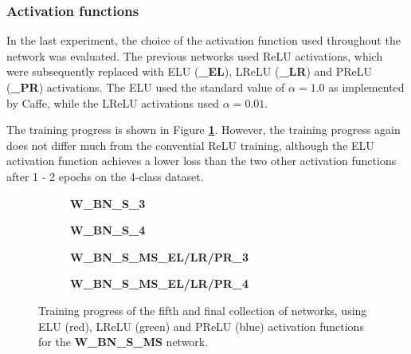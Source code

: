 	\subsubsection{Activation functions}

In the last experiment, the choice of the activation function used throughout the network was evaluated. The previous networks used ReLU activations, which were subsequently replaced with ELU (\textbf{\_EL}), LReLU (\textbf{\_LR}) and PReLU (\textbf{\_PR}) activations. The ELU used the standard value of $\alpha = 1.0$ as implemented by Caffe, while the LReLU activations used $\alpha = 0.01$.

The training progress is shown in Figure \textbf{\ref{fig:weighted_batchnorm_shuffle_msra_acts_training}}. However, the training progress again does not differ much from the convential ReLU training, although the ELU activation function achieves a lower loss than the two other activation functions after 1 - 2 epochs on the 4-class dataset.\\


\begin {figure}[!htb]
	\begin {subfigure}[b]{0.4\linewidth}
		\scalebox{0.65}{}
		\caption{\textbf{W\_BN\_S\_3}}
	\end {subfigure}\hspace{1.75cm}
	\begin {subfigure}[b]{0.4\linewidth}
		\scalebox{0.65}{}
		\caption{\textbf{W\_BN\_S\_4}}
	\end {subfigure}

	\begin {subfigure}[b]{0.4\linewidth}
		\scalebox{0.65}{}
		\caption{\textbf{W\_BN\_S\_MS\_EL/LR/PR\_3}}
	\end {subfigure}\hspace{1.75cm}
	\begin {subfigure}[b]{0.4\linewidth}
		\scalebox{0.65}{}
		\caption{\textbf{W\_BN\_S\_MS\_EL/LR/PR\_4}}
	\end {subfigure}

		\caption[Training progress of the fifth collection of networks.]{Training progress of the fifth and final collection of networks, using ELU (red), LReLU (green) and PReLU (blue) activation functions for the \textbf{W\_BN\_S\_MS} network.}
		\label{fig:weighted_batchnorm_shuffle_msra_acts_training}
\end {figure}

